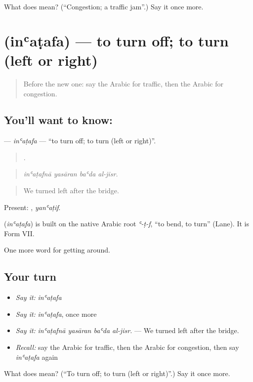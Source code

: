 \begin{tcolorbox}[breakable,colback=teal!4,colframe=teal!35!black,title={Before you move on}]
What does  mean? (\textquotedblleft{}Congestion; a traffic jam\textquotedblright{}.) Say it once more.
\end{tcolorbox}
\section[\texorpdfstring{\ar{انعطف} (inʿaṭafa)}{انعطف (inʿaṭafa)}]{ (inʿaṭafa) — to turn off; to turn (left or right)}

\label{lesson:AR-C431-inatafa}



\begin{quote}
Before the new one: say the Arabic for traffic, then the Arabic for congestion.
\end{quote}

\subsection*{You'll want to know: }
\textbf{} — \emph{inʿaṭafa} — \textquotedblleft{}to turn off; to turn (left or right)\textquotedblright{}.

\begin{quote}
   .
\end{quote}

\begin{quote}
\emph{inʿaṭafnā yasāran baʿda al-jisr.}
\end{quote}

\begin{quote}
We turned left after the bridge.
\end{quote}

Present: , \emph{yanʿaṭif}.

\begin{cousinweb}
\textbf{} (\emph{inʿaṭafa}) is built on the native Arabic root \emph{ʿ-ṭ-f}, \textquotedblleft{}to bend, to turn\textquotedblright{} (Lane). It is Form VII.
\end{cousinweb}

\begin{grammarlens}[title={What you've built}]
One more word for getting around.
\end{grammarlens}

\subsection*{Your turn}
\begin{itemize}
\raggedright
  \item \emph{Say it:} \emph{inʿaṭafa}
  \item \emph{Say it:} \emph{inʿaṭafa}, once more
  \item \emph{Say it:} \emph{inʿaṭafnā yasāran baʿda al-jisr.} — We turned left after the bridge.
  \item \emph{Recall:} say the Arabic for traffic, then the Arabic for congestion, then say \emph{inʿaṭafa} again
\end{itemize}

\begin{tcolorbox}[breakable,colback=teal!4,colframe=teal!35!black,title={Before you move on}]
What does  mean? (\textquotedblleft{}To turn off; to turn (left or right)\textquotedblright{}.) Say it once more.
\end{tcolorbox}
